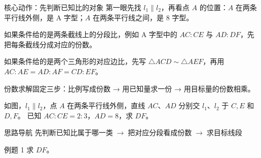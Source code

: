 \documentclass{exam-zh}
\begin{document}


\begin{eduSolutionBox}{核心动作：先判断已知比的对象}
  \begingroup
  \setlength{\parskip}{2.5mm}
第一眼先找 $l_1\parallel l_2$，再看点 $A$ 的位置：$A$ 在两条平行线外侧，是 A 字型；$A$ 在两条平行线之间，是 8 字型。\par
如果条件给的是两条截线上的分段比，例如 A 字型中的 $AC:CE$ 与 $AD:DF$，先把每条截线分成对应的份数。\par
如果条件给的是两个三角形的对应边比，先写 $\triangle ACD\sim\triangle AEF$，再用 $AC:AE=AD:AF=CD:EF$。\par
份数求解固定三步：比例写成份数 → 用已知量求一份 → 用目标量的份数相乘。\par
  \endgroup
\end{eduSolutionBox}




\begin{eduProblemBlock}[例题 1]
\noindent
\begin{minipage}[t]{\dimexpr\linewidth-70mm-6mm\relax}
\vspace{0pt}
如图，$l_1\parallel l_2$，点 $A$ 在两条平行线外侧，直线 $AC$、$AD$ 分别交 $l_1$、$l_2$ 于 $C,E$ 和 $D,F$。
已知 $AC:CE=2:3$，$AD=8$，求 $DF$。

\end{minipage}\hfill
\begin{diagramcoltikz}{70mm}{例题 1：A 字型中先看两条截线上的分段比。}
}
\end{diagramcoltikz}
\end{eduProblemBlock}





\begin{eduAuxItem}{思路导航}
先判断已知比属于哪一类$\;\to\;$把对应分段看成份数$\;\to\;$求目标线段\end{eduAuxItem}




\begin{eduSubQuestionItem}{例题 1}
求 $DF$。\end{eduSubQuestionItem}
\end{document}
